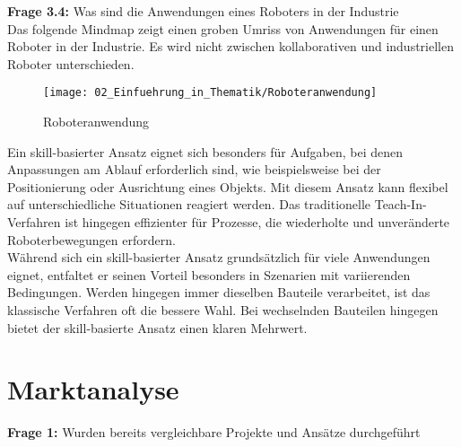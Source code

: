 	\vspace{3mm}
	
	\newpage
	
	\textbf{Frage 3.4:} Was sind die Anwendungen eines Roboters in der Industrie \vspace{2mm} 
	\\
		Das folgende Mindmap zeigt einen groben Umriss von Anwendungen für einen Roboter in der Industrie. Es wird nicht zwischen kollaborativen und industriellen Roboter unterschieden. 
		
		\begin{figure}[h!]
			\centering
			\texttt{[image: 02\_Einfuehrung\_in\_Thematik/Roboteranwendung]}
			\captionsetup{justification=centering}
			\caption{Roboteranwendung}
			\label{fig:Roboteranwendung}
		\end{figure}
		
		Ein skill-basierter Ansatz eignet sich besonders für Aufgaben, bei denen Anpassungen am Ablauf erforderlich sind, wie beispielsweise bei der Positionierung oder Ausrichtung eines Objekts. Mit diesem Ansatz kann flexibel auf unterschiedliche Situationen reagiert werden. Das traditionelle Teach-In-Verfahren ist hingegen effizienter für Prozesse, die wiederholte und unveränderte Roboterbewegungen erfordern.
		\\
		Während sich ein skill-basierter Ansatz grundsätzlich für viele Anwendungen eignet, entfaltet er seinen Vorteil besonders in Szenarien mit variierenden Bedingungen. Werden hingegen immer dieselben Bauteile verarbeitet, ist das klassische Verfahren oft die bessere Wahl. Bei wechselnden Bauteilen hingegen bietet der skill-basierte Ansatz einen klaren Mehrwert.
		
		
	\vspace{3mm}

	\newpage


\section{Marktanalyse} \label{Marktanalyse}

	\textbf{Frage 1:} Wurden bereits vergleichbare Projekte und Ansätze durchgeführt \vspace{2mm} 
	\\
	
